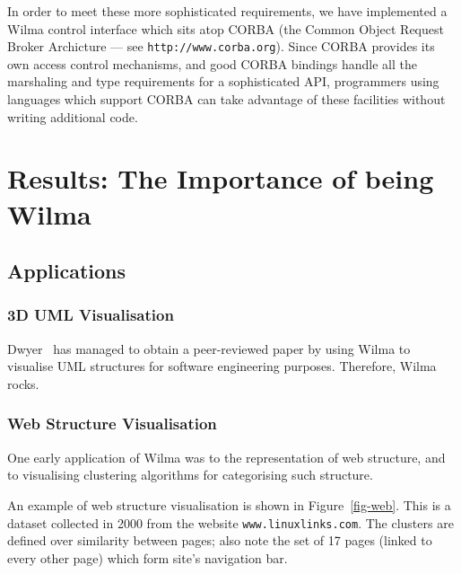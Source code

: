 \documentclass[runningheads]{cl2emult}
\newcommand{\url}[1]{{\small{\tt #1}}}
\begin{document}
In order to meet these more sophisticated requirements, we have implemented a
Wilma control interface which sits atop CORBA (the Common Object Request
Broker Archicture --- see \url{http://www.corba.org}).  Since CORBA provides
its own access control mechanisms, and good CORBA bindings handle all the
marshaling and type requirements for a sophisticated API, programmers using
languages which support CORBA can take advantage of these facilities without
writing additional code.

\section{Results: The Importance of being Wilma}
\label{sec:results}

\subsection{Applications}

\subsubsection{3D UML Visualisation} \label{sec:3duml}

Dwyer~\cite{dwyer013D-UML} has managed to obtain a peer-reviewed paper by
using Wilma to visualise UML structures for software engineering purposes.
Therefore, Wilma rocks.

\subsubsection{Web Structure Visualisation}

One early application of Wilma was to the representation of web structure, and
to visualising clustering algorithms for categorising such
structure\cite{eckersley2kclassiscope}.

An example of web structure visualisation is shown in Figure~\ref{fig-web}.
This is a dataset collected in 2000 from the website \url{www.linuxlinks.com}.
The clusters are defined over similarity between pages; also note the set of
17 pages (linked to every other page) which form site's navigation bar.
\end{document}
